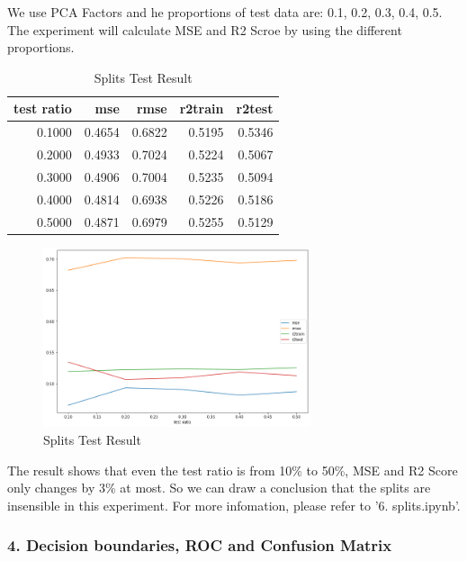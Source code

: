 \documentclass[UTF8]{ctexart}
\begin{document}
We use PCA Factors and he proportions of test data are: 0.1, 0.2, 0.3, 0.4, 0.5. The experiment will calculate MSE and R2 Scroe by using the different proportions.

\begin{table}[htbp]
	\centering
	\begin{tabular}{rrrrr}
		\toprule
		test ratio & mse    & rmse   & r2train & r2test \\
		\midrule
		0.1000     & 0.4654 & 0.6822 & 0.5195  & 0.5346 \\
		0.2000     & 0.4933 & 0.7024 & 0.5224  & 0.5067 \\
		0.3000     & 0.4906 & 0.7004 & 0.5235  & 0.5094 \\
		0.4000     & 0.4814 & 0.6938 & 0.5226  & 0.5186 \\
		0.5000     & 0.4871 & 0.6979 & 0.5255  & 0.5129 \\
		\bottomrule
	\end{tabular}
	\setlength{\abovecaptionskip}{0.3cm}
	\setlength{\belowcaptionskip}{0cm}

	\caption{Splits Test Result}
\end{table}

\begin{figure}[H]
	\centerline{\includegraphics[width=0.70\textwidth]{splits.png}}
	\caption{Splits Test Result}
\end{figure}

The result shows that even the test ratio is from 10\% to 50\%, MSE and R2 Score only changes by 3\% at most. So we can draw a conclusion that the splits are insensible in this experiment. For more infomation, please refer to '6. splits.ipynb'.

\subsubsection*{4. Decision boundaries, ROC and Confusion Matrix}
\end{document}
